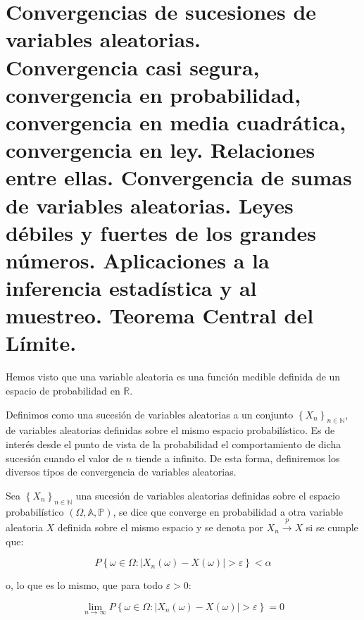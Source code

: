 
\chapter[Convergencias de sucesiones de variables aleatorias.]{Convergencias de sucesiones de variables aleatorias.\\
\normalsize Convergencia casi segura, convergencia en probabilidad, convergencia en media cuadr\'atica, convergencia en ley. Relaciones entre ellas. Convergencia de sumas de variables aleatorias. Leyes d\'ebiles y fuertes de los grandes n\'umeros. Aplicaciones a la inferencia estad\'istica y al muestreo. Teorema Central del L\'imite.}



Hemos visto que una variable aleatoria es una funci\'on medible definida de un espacio de probabilidad en $\mathbb{R}$.

Definimos como una sucesi\'on de variables aleatorias a un conjunto $\left\{X_n\right\}_{n\in\mathbb{N}}$, de variables aleatorias definidas sobre el mismo espacio probabil\'istico. Es de inter\'es desde el punto de vista de la probabilidad el comportamiento de dicha sucesi\'on cuando el valor de $n$ tiende a infinito. De esta forma, definiremos los diversos tipos de convergencia de variables aleatorias.


\begin{definicion}

Sea $ \left\{X_n\right\}_{n\in\mathbb{N}} $ una sucesi\'on de variables aleatorias definidas sobre el espacio probabil\'istico $\left(\Omega,\mathbb{A}, \mathbb{P}\right) $, se dice que converge en probabilidad a otra variable aleatoria $X$ definida sobre el mismo espacio y se denota por $X_{n} \overset{p}{\to} X $ si se cumple que:

\begin{equation}
P\left\{ \omega\in\Omega:\left|X_{n}(\omega)-X(\omega)\right|>\varepsilon\right\} <\alpha
\end{equation}

\end{definicion}
o, lo que es lo mismo, que para todo $\varepsilon > 0$:

\begin{equation}
\lim_{n\rightarrow\infty}P\left\{ \omega\in\Omega:\left|X_{n}(\omega)-X(\omega)\right|>\varepsilon\right\} =0
\end{equation}

